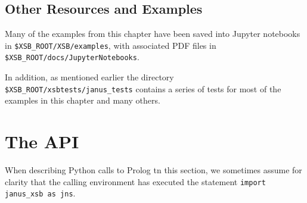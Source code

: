 
%
%
%

\subsection{Other \januspy{} Resources and Examples}

Many of the examples from this chapter have been saved into Jupyter
notebooks in {\tt \$XSB\_ROOT/XSB/examples}, with associated PDF files in
{\tt \$XSB\_ROOT/docs/JupyterNotebooks}.

In addition, as mentioned earlier the directory {\tt
  \$XSB\_ROOT/xsbtests/janus\_tests} contains a series of tests for
most of the examples in this chapter and many others.
\section{The \januspy{} API}

When describing Python calls to Prolog tn this section, we sometimes
assume for clarity that the calling environment has executed the
statement {\tt import janus\_xsb as jns}.

